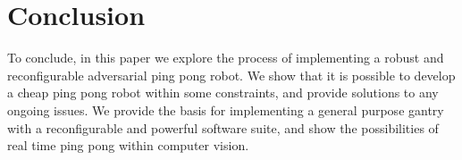 \chapter{Conclusion}
To conclude, in this paper we explore the process of implementing a robust and reconfigurable adversarial ping pong robot. We show that it is possible to develop a cheap ping pong robot within some constraints, and provide solutions to any ongoing issues. We provide the basis for implementing a general purpose gantry with a reconfigurable and powerful software suite, and show the possibilities of real time ping pong within computer vision.